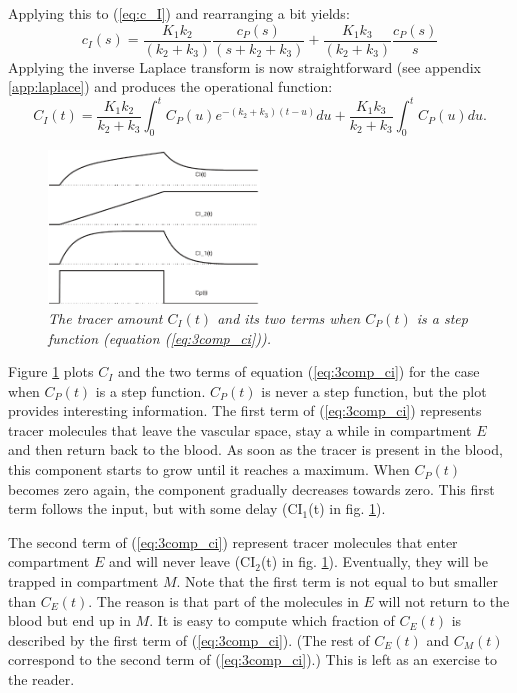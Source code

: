 \documentclass[11pt,oneside]{book}
\begin{document}
Applying this to (\ref{eq:c_I}) and rearranging a bit yields:
\begin{equation}
  c_I(s) = \frac{K_1 k_2}{(k_2 + k_3)} \frac{c_P(s)}{(s + k_2 + k_3)} + 
           \frac{K_1 k_3}{(k_2 + k_3)} \frac{c_P(s)}{s}
\end{equation}
Applying the inverse Laplace transform is now straightforward (see appendix
\ref{app:laplace}) and produces the operational function:
\begin{equation}
  C_I(t) = \frac{K_1 k_2}{k_2 + k_3} \int_0^t C_P(u) e^{-(k_2 + k_3)(t - u)}du
         + \frac{K_1 k_3}{k_2 + k_3} \int_0^t C_P(u) du. \label{eq:3comp_ci}
\end{equation}

\begin{figure}[tb]
\centering
\includegraphics[width=0.5\textwidth]{figs/fig_3comp_ci.pdf}
\caption{\label{fig:3comp_ci} \emph{The tracer amount $C_I(t)$ and its two
terms when $C_P(t)$ is a step function (equation (\ref{eq:3comp_ci})).}}
\end{figure}
%
Figure \ref{fig:3comp_ci} plots $C_I$ and the two terms of equation
(\ref{eq:3comp_ci}) for the case when $C_P(t)$ is a step function. $C_P(t)$ is
never a step function, but the plot provides interesting information. The
first term of (\ref{eq:3comp_ci}) represents tracer molecules that leave the
vascular space, stay a while in compartment $E$ and then return back to the
blood. As soon as the tracer is present in the blood, this component starts to
grow until it reaches a maximum. When $C_P(t)$ becomes zero again, the
component gradually decreases towards zero. This first term follows the input,
but with some delay (CI$_1$(t) in fig. \ref{fig:3comp_ci}).

The second term of (\ref{eq:3comp_ci}) represent tracer molecules that
enter compartment $E$ and will never leave (CI$_2$(t) in
fig. \ref{fig:3comp_ci}). Eventually, they will be trapped in
compartment $M$. Note that the first term is not equal to but smaller
than $C_E(t)$. The reason is that part of the molecules in $E$ will
not return to the blood but end up in $M$. It is easy to compute which
fraction of $C_E(t)$ is described by the first term of
(\ref{eq:3comp_ci}). (The rest of $C_E(t)$ and $C_M(t)$ correspond to
the second term of (\ref{eq:3comp_ci}).) This is left as an exercise
to the reader.
\end{document}
